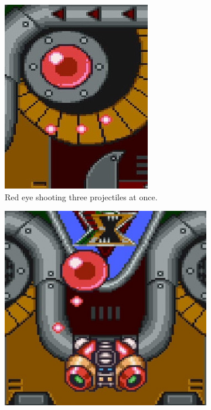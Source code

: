 \begin{figure}[htp]
\begin{subfigure}[t]{0.30\linewidth}
		\includegraphics[width=\linewidth]{figures/X1/Sigma_stages/Rangda_red_1.jpg}
		\caption{Red eye shooting three projectiles at once.}
	\end{subfigure}
	\begin{subfigure}{0.40\linewidth}
		\centering
		\includegraphics[width=\linewidth]{figures/X1/Sigma_stages/Rangda_red_2.jpg}

\end{subfigure}
\end{figure}
